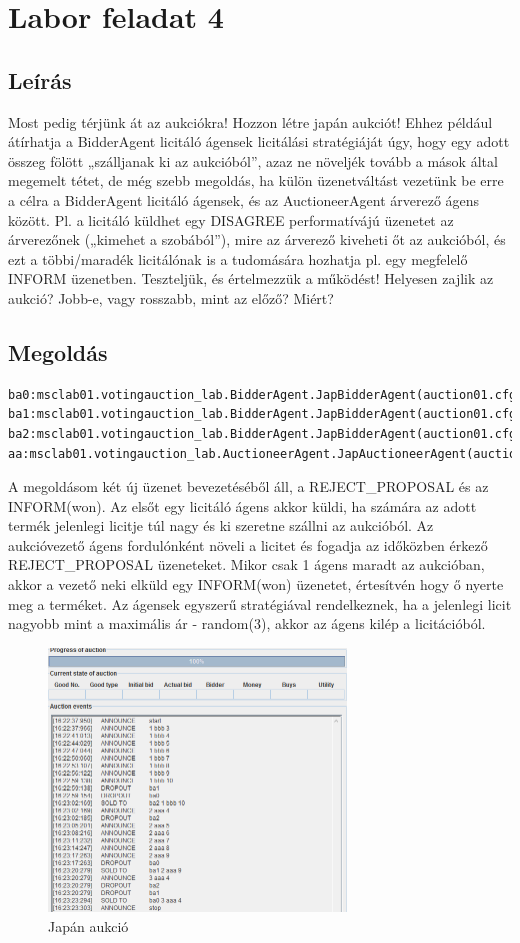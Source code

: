 \section{Labor feladat 4}
\subsection{Leírás}
Most pedig térjünk át az aukciókra! Hozzon létre japán aukciót! Ehhez például átírhatja a
BidderAgent licitáló ágensek licitálási stratégiáját úgy, hogy egy adott összeg fölött
„szálljanak ki az aukcióból”, azaz ne növeljék tovább a mások által megemelt tétet, de még
szebb megoldás, ha külön üzenetváltást vezetünk be erre a célra a BidderAgent licitáló
ágensek, és az AuctioneerAgent árverező ágens között. Pl. a licitáló küldhet egy
DISAGREE performatívájú üzenetet az árverezőnek („kimehet a szobából”), mire az árverező
kiveheti őt az aukcióból, és ezt a többi/maradék licitálónak is a tudomására hozhatja pl. egy
megfelelő INFORM üzenetben. Teszteljük, és értelmezzük a működést! Helyesen zajlik az
aukció? Jobb-e, vagy rosszabb, mint az előző? Miért?
\subsection{Megoldás}
\begin{lstlisting}[caption=Használt run-config, frame=single,float=!ht]
ba0:msclab01.votingauction_lab.BidderAgent.JapBidderAgent(auction01.cfg)
ba1:msclab01.votingauction_lab.BidderAgent.JapBidderAgent(auction01.cfg)
ba2:msclab01.votingauction_lab.BidderAgent.JapBidderAgent(auction01.cfg)
aa:msclab01.votingauction_lab.AuctioneerAgent.JapAuctioneerAgent(auction01.cfg)
\end{lstlisting}
A megoldásom két új üzenet bevezetéséből áll, a REJECT\_PROPOSAL és az INFORM(won). Az elsőt egy licitáló ágens akkor küldi, ha számára az adott termék jelenlegi licitje túl nagy és ki szeretne szállni az aukcióból. Az aukcióvezető ágens fordulónként növeli a licitet és fogadja az időközben érkező REJECT\_PROPOSAL üzeneteket. Mikor csak 1 ágens maradt az aukcióban, akkor a vezető neki elküld egy INFORM(won) üzenetet, értesítvén hogy ő nyerte meg a terméket. Az ágensek egyszerű stratégiával rendelkeznek, ha a jelenlegi licit nagyobb mint a maximális ár - random(3), akkor az ágens kilép a licitációból.
\begin{figure}[!h]
\begin{center}
\includegraphics[height=7cm]{figures/fel4.png}
\caption{Japán aukció}
\end{center}
\end{figure}

